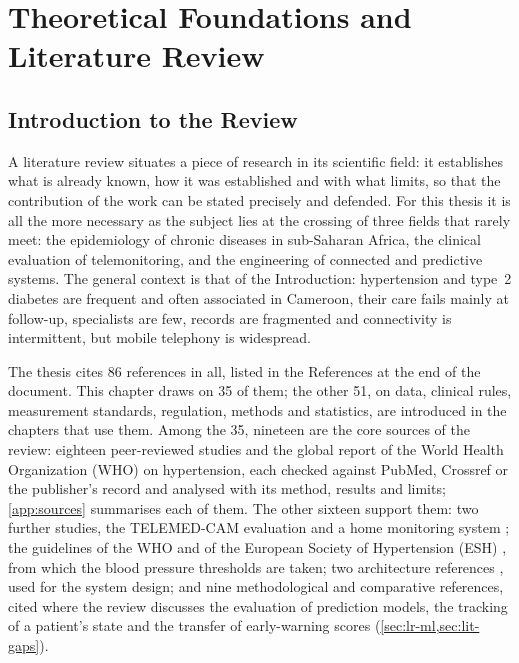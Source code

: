 \chapter{Theoretical Foundations and Literature Review}\label{ch:review}\label{ch:background}\label{ch:litreview}

\section{Introduction to the Review}\label{sec:lr-intro}

A literature review situates a piece of research in its scientific field: it establishes what is already known, how it was established and with what limits, so that the contribution of the work can be stated precisely and defended. For this thesis it is all the more necessary as the subject lies at the crossing of three fields that rarely meet: the epidemiology of chronic diseases in sub-Saharan Africa, the clinical evaluation of telemonitoring, and the engineering of connected and predictive systems. The general context is that of the Introduction: hypertension and type~2 diabetes are frequent and often associated in Cameroon, their care fails mainly at follow-up, specialists are few, records are fragmented and connectivity is intermittent, but mobile telephony is widespread.

The thesis cites 86 references in all, listed in the References at the end of the document. This chapter draws on 35 of them; the other 51, on data, clinical rules, measurement standards, regulation, methods and statistics, are introduced in the chapters that use them. Among the 35, nineteen are the core sources of the review: eighteen peer-reviewed studies and the global report of the World Health Organization (WHO) on hypertension, each checked against PubMed, Crossref or the publisher's record and analysed with its method, results and limits; \cref{app:sources} summarises each of them. The other sixteen support them: two further studies, the TELEMED-CAM evaluation \parencite{kingue2013} and a home monitoring system \parencite{chatrati2022}; the guidelines of the WHO \parencite{who2021guideline,whoHEARTS} and of the European Society of Hypertension (ESH) \parencite{mancia2023}, from which the blood pressure thresholds are taken; two architecture references \parencite{mucchi2021,yazdani2018}, used for the system design; and nine methodological and comparative references, cited where the review discusses the evaluation of prediction models, the tracking of a patient's state and the transfer of early-warning scores (\cref{sec:lr-ml,sec:lit-gaps}).


